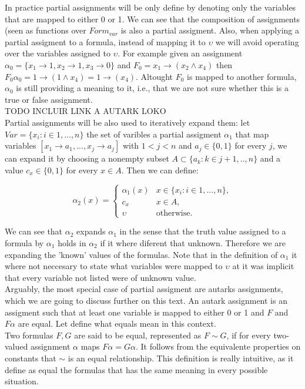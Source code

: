 \begin{definition}
In practice partial assignments will be only define by denoting only the variables that are mapped to either 0 or 1. We can see that the composition of assignments (seen as functions over $Form_{var}$ is also a partial assigment. Also, when applying a partial assigment to a formula, instead of mapping it to $\upsilon$ we will avoid operating over the variables assigned to $\upsilon$. For example given an assignment $\alpha_0 = \{x_1 \to 1, x_2\to 1, x_3 \to 0\}$ and $F_0=x_1\to (x_2\wedge x_4)$ then  $F_0\alpha_0=1 \to (1\wedge x_4)= 1 \to (x_4)$. Altought $F_0$ is mapped to another formula, $\alpha_0$ is still providing a meaning to it, i.e., that we are not sure whether this is a true or false assignment. \\

TODO INCLUIR LINK A AUTARK LOKO\\

Partial assignments will be also used to iteratively expand them: let $Var= \{x_i:i\in 1,...,n\}$ the set of varibles a partial assigment $\alpha_1$ that map variables $[x_1\to a_1,...,x_j\to a_j]$ with $1<j<n$ and $a_j\in\{0,1\}$ for every $j$, we can expand it by choosing a nonempty subset  $A\subset\{a_k: k\in j+1,..,n\}$ and a value $c_x \in \{0,1\}$ for every $x\in A$. Then we can define:

$$
\alpha_2(x)=
\begin{cases}
\alpha_1(x) & x \in \{x_i : i \in 1,...,n\},\\
c_x & x\in A, \\
\upsilon & \text{otherwise}.
\end{cases}
$$

We can see that $\alpha_2$ expands $\alpha_1$ in the sense that the truth value assigned to a formula by $\alpha_1$ holds in $\alpha_2$ if it where diferent that unknown. Therefore we are expanding the 'known' values of the formulas. Note that in the definition of $\alpha_1$ it where not neccesary to state what variables were mapped to $\upsilon$ at it was implicit that every variable not listed were of unknown  value.\\

Arguably, the most special case of partial assigment are autarks assignments, which we are going to discuss further on this text. An autark assignment is an assigment such that at least one variable is mapped to either 0 or 1 and $F$ and $F\alpha$ are equal. Let define what equals mean in this context.\\

Two formulas $F,G$ are said to be equal, represented as $F\sim G$, if for every two-valued assignment $\alpha$ maps $F\alpha = G\alpha$. It follows from the equivalente properties on constants that $\sim$ is an equal relationship. This definition is really intuitive, as it define as equal the formulas that has the same meaning in every possible situation. \\


\end{definition}
